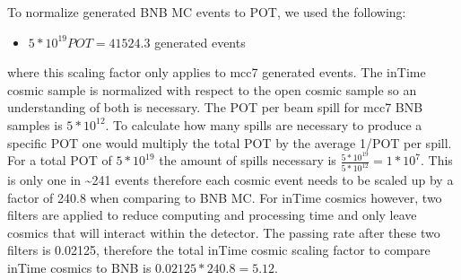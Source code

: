 To normalize generated BNB MC events to POT, we used the following:
\begin{itemize}
\item{ $5 * 10^{19} POT = 41524.3$ generated events}
\end{itemize}
where this scaling factor only applies to mcc7 generated events. The inTime cosmic sample is normalized with respect to the open cosmic sample so an understanding of both is necessary. The POT per beam spill for mcc7 BNB samples is $5 * 10^{12}$. To calculate how many spills are necessary to produce a specific POT one would multiply the total POT by the average 1/POT per spill. For a total POT of $5 * 10^{19}$ the amount of spills necessary is $\frac{5 * 10^{19}}{5 * 10^{12}} = 1 * 10^7$. This is only one in \sim 241 events therefore each cosmic event needs to be scaled up by a factor of 240.8 when comparing to BNB MC. For inTime cosmics however, two filters are applied to reduce computing and processing time and only leave cosmics that will interact within the detector. The passing rate after these two filters is 0.02125, therefore the total inTime cosmic scaling factor to compare inTime cosmics to BNB is $0.02125 * 240.8 = 5.12$.

